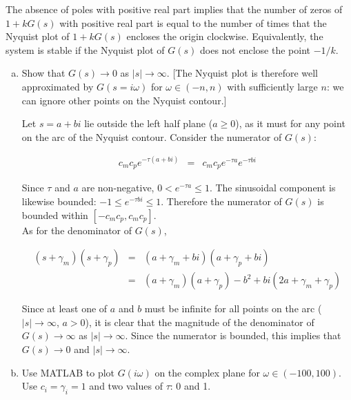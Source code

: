 \documentclass{article}
\begin{document}
The absence of poles with positive real part implies that the number of zeros of $1 + kG(s)$ with positive real part is equal to the number of times that the Nyquist plot of $1 + kG(s)$ encloses the origin clockwise. Equivalently, the system is stable if the Nyquist plot of $G(s)$ does not enclose the point $-1/k$.

\begin{enumerate}[a)]
\setlength{\itemsep}{0pt}
\setcounter{enumi}{5}
\item Show that $G(s) \to 0$ as $|s| \to \infty$. [The Nyquist plot is therefore well approximated by $G(s=i\omega)$ for $\omega \in (-n, n)$ with sufficiently large $n$: we can ignore other points on the Nyquist contour.]\\

{\color{red}
Let $s = a + bi$ lie outside the left half plane ($a \geq 0$), as it must for any point on the arc of the Nyquist contour. Consider the numerator of $G(s)$:

\begin{eqnarray*}
c_m c_p e^{-\tau (a + bi)} & = & c_m c_p e^{-\tau a } e^{- \tau bi} 
\end{eqnarray*}

Since $\tau$ and $a$ are non-negative, $0 < e^{-\tau a} \leq 1$. The sinusoidal component is likewise bounded: $-1 \leq e^{-\tau bi} \leq 1$. Therefore the numerator of $G(s)$ is bounded within $[-c_m c_p, c_m c_p]$.\\

As for the denominator of $G(s)$,

\begin{eqnarray*}
\left(s + \gamma_m \right) \left(s + \gamma_p \right) & = & \left(a + \gamma_m + bi \right) \left(a + \gamma_p + bi \right)\\
& = & \left(a + \gamma_m \right) \left( a + \gamma_p \right) - b^2 + bi \left(2a + \gamma_m + \gamma_p \right)
\end{eqnarray*}

Since at least one of $a$ and $b$ must be infinite for all points on the arc ($|s| \to \infty$, $a > 0$), it is clear that the magnitude of the denominator of $G(s) \to \infty$ as $|s| \to \infty$. Since the numerator is bounded, this implies that $G(s) \to 0$ and $|s| \to \infty$.

}


\item Use MATLAB to plot $G(i\omega)$ on the complex plane for $\omega \in (-100, 100)$. Use $c_i=\gamma_i=1$ and two values of $\tau$: 0 and 1.


\end{enumerate}
\end{document}
